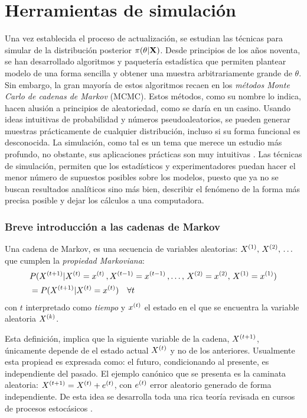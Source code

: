 \documentclass[../Main/Main.tex]{subfiles}
\begin{document}
\section{Herramientas de simulación} \label{sec:GibbsSampler}
Una vez establecida el proceso de actualización, se estudian las técnicas para simular de la distribución posterior $\pi(\theta|\mathbf{X})$. Desde principios de los años noventa, se han desarrollado algoritmos y paquetería estadística que permiten plantear modelo de una forma sencilla y obtener una muestra arbitrariamente grande de $\theta$. Sin embargo, la gran mayoría de estos algoritmos recaen en los \textit{métodos Monte Carlo de cadenas de Markov} (MCMC). Estos métodos, como su nombre lo indica, hacen alusión a principios de aleatoriedad, como se daría en un casino. Usando ideas intuitivas de probabilidad y números pseudoaleatorios, se pueden generar muestras prácticamente de cualquier distribución, incluso si su forma funcional es desconocida. La simulación, como tal es un tema que merece un estudio más profundo, no obstante, sus aplicaciones prácticas son muy intuitivas \autocite{robert2004monte}. Las técnicas de simulación, permiten que los estadísticos y experimentadores puedan hacer el menor número de supuestos posibles sobre los modelos, puesto que ya no se buscan resultados analíticos sino más bien, describir el fenómeno de la forma más precisa posible y dejar los cálculos a una computadora.

\subsubsection*{Breve introducción a las cadenas de Markov}
\begin{definition}
Una cadena de Markov, es una secuencia de variables aleatorias: $X^{(1)},\,X^{(2)},\,\ldots$ que cumplen la \textit{propiedad Markoviana}:
\begin{align*}
&P(X^{(t+1)}|X^{(t)} = x^{(t)}\, ,X^{(t-1)} = x^{(t-1)}\,,\ldots,\,X^{(2)} = x^{(2)},\,X^{(1)} = x^{(1)}) \\
&= P(X^{(t+1)}|X^{(t)} = x^{(t)}) \quad\forall t
\end{align*}
con $t$ interpretado como \textit{tiempo} y $x^{(t)}$ el estado en el que se encuentra la variable aleatoria $X^{(k)}$.
\end{definition}
Esta definición, implica que la siguiente variable de la cadena, $X^{(t+1)}$, únicamente depende de el estado actual $X^{(t)}$ y no de los anteriores. Usualmente esta propiead es expresada como: el futuro, condicionando al presente, es independiente del pasado. El ejemplo canónico que se presenta es la caminata aleatoria: $X^{(t+1)} = X^{(t)} + e^{(t)}$, con $e^{(t)}$ error aleatorio generado de forma independiente. De esta idea se desarrolla toda una rica teoría revisada en cursos de procesos estocásicos \autocite{ross2009introduction}. 
\end{document}
